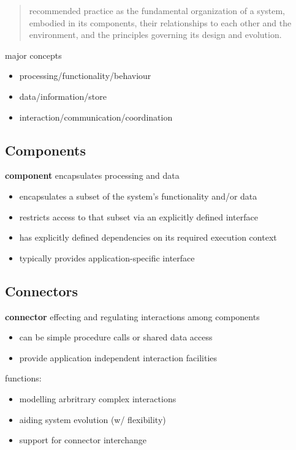 \documentclass[]{article}
\theoremstyle{definition}
\begin{document}
	\begin{quote}
	recommended practice as the fundamental organization of a system, embodied in its components, their relationships to each other and the environment, and the principles governing its design and evolution. 
	\end{quote}

	major concepts
	\begin{itemize}
		\item processing/functionality/behaviour
		\item data/information/store
		\item interaction/communication/coordination
	\end{itemize}
	
	\subsection{Components}
	\textbf{component} encapsulates processing and data
	\begin{itemize}
		\item encapsulates a subset of the system’s functionality and/or data
		\item restricts access to that subset via an explicitly defined interface
		\item has explicitly defined dependencies on its required execution context
		\item typically provides application-specific interface
	\end{itemize}

	\subsection{Connectors}
	\textbf{connector} effecting and regulating interactions among components
	\begin{itemize}
		\item can be simple procedure calls or shared data access
		\item provide application independent interaction facilities
	\end{itemize}
	functions:
	\begin{itemize}
		\item modelling arbritrary complex interactions
		\item aiding system evolution (w/ flexibility)
		\item support for connector interchange 
	\end{itemize}
\end{document}
